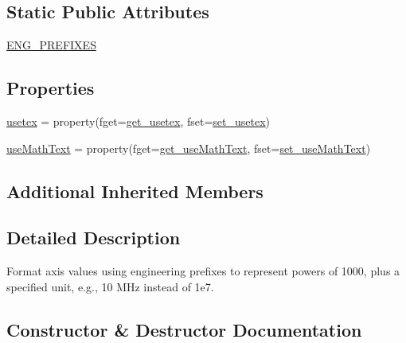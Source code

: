 \subsection*{Static Public Attributes}
\begin{DoxyCompactItemize}
\item 
\hyperlink{classmatplotlib_1_1ticker_1_1EngFormatter_a6f5e6c1b7294ae175f8b28217a219b4c}{E\+N\+G\+\_\+\+P\+R\+E\+F\+I\+X\+ES}
\end{DoxyCompactItemize}
\subsection*{Properties}
\begin{DoxyCompactItemize}
\item 
\hyperlink{classmatplotlib_1_1ticker_1_1EngFormatter_a6c468506265aea1c1e318189b85ba090}{usetex} = property(fget=\hyperlink{classmatplotlib_1_1ticker_1_1EngFormatter_ad6bc6039174ded9f7c635daafb5a374b}{get\+\_\+usetex}, fset=\hyperlink{classmatplotlib_1_1ticker_1_1EngFormatter_ab94e885a78e1664f26dce91fc3c57ea7}{set\+\_\+usetex})
\item 
\hyperlink{classmatplotlib_1_1ticker_1_1EngFormatter_a8563f9a8c3425646727df4047f76be6a}{use\+Math\+Text} = property(fget=\hyperlink{classmatplotlib_1_1ticker_1_1EngFormatter_a750de40e2dc3836c5a6cd3dd687628f2}{get\+\_\+use\+Math\+Text}, fset=\hyperlink{classmatplotlib_1_1ticker_1_1EngFormatter_ad3f4d5a8f93c3359ae9803c4a514dfe1}{set\+\_\+use\+Math\+Text})
\end{DoxyCompactItemize}
\subsection*{Additional Inherited Members}


\subsection{Detailed Description}
\begin{DoxyVerb}Format axis values using engineering prefixes to represent powers
of 1000, plus a specified unit, e.g., 10 MHz instead of 1e7.
\end{DoxyVerb}
 

\subsection{Constructor \& Destructor Documentation}
\mbox{\label{classmatplotlib_1_1ticker_1_1EngFormatter_add189dc36cfb426df61b149aa085e253}} 
